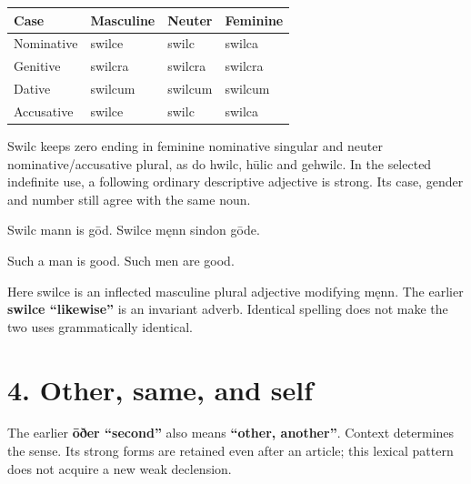 \par\begingroup
\fontsize{10.5}{13.2}\selectfont
\setlength{\LTleft}{0pt}\setlength{\LTright}{\fill}
\noindent
\begin{tabular}{@{}>{\raggedright\arraybackslash}p{28.89mm}>{\raggedright\arraybackslash}p{28.89mm}>{\raggedright\arraybackslash}p{28.89mm}>{\raggedright\arraybackslash}p{28.89mm}@{}}
\toprule
\textbf{Case} & \textbf{Masculine} & \textbf{Neuter} & \textbf{Feminine} \\
\midrule
Nominative & swilce & swilc & swilca \\
Genitive & swilcra & swilcra & swilcra \\
Dative & swilcum & swilcum & swilcum \\
Accusative & swilce & swilc & swilca \\
\bottomrule
\end{tabular}
\par\endgroup

Swilc keeps zero ending in feminine nominative singular and neuter nominative/\allowbreak{}accusative plural, as do hwilc, hūlic and gehwilc. In the selected indefinite use, a following ordinary descriptive adjective is strong. Its case, gender and number still agree with the same noun.

Swilc mann is gōd. Swilce męnn sindon gōde.

Such a man is good. Such men are good.

Here swilce is an inflected masculine plural adjective modifying męnn. The earlier \textbf{swilce “likewise”} is an invariant adverb. Identical spelling does not make the two uses grammatically identical.

\section*{4. Other, same, and self}

The earlier \textbf{ōðer “second”} also means \textbf{“other, another”}. Context determines the sense. Its strong forms are retained even after an article; this lexical pattern does not acquire a new weak declension.

